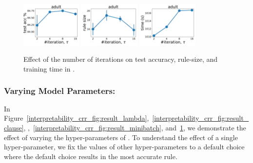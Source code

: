 \begin{figure}
	\subfloat
	{\includegraphics[width=0.27\textwidth]{figures/interpretability/relaxed-cnf/adult_test_accuracy_vary_iteration.pdf}}
	\subfloat
	{\includegraphics[width=0.27\textwidth]{figures/interpretability/relaxed-cnf/adult_rule_size_vary_iteration.pdf}}
	\subfloat
	{\includegraphics[width=0.27\textwidth]{figures/interpretability/relaxed-cnf/adult_time_vary_iteration.pdf}} 
	\\
	
	
	\caption[Effect of the number of iterations in {\crr}]{Effect of the number of iterations on test accuracy, rule-size, and training time in {\crr}. } 
	\label{interpretability_crr_fig:result_iteration}
\end{figure}





	

	\subsubsection*{Varying Model Parameters: }
	\label{interpretability_crr_sec:model_parameters}
	In Figure~\ref{interpretability_crr_fig:result_lambda},~\ref{interpretability_crr_fig:result_clause}, ,~\ref{interpretability_crr_fig:result_minibatch}, and~\ref{interpretability_crr_fig:result_iteration}, we demonstrate the effect of varying the hyper-parameters of {\crr}. To understand the effect of a single hyper-parameter, we fix the values of other hyper-parameters to a default choice where the default choice results in the most accurate rule. 
	 


